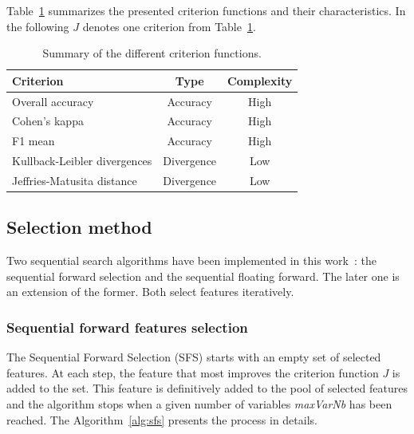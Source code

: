 \documentclass[journal]{IEEEtran}
\begin{document}
        Table~\ref{tab:crit} summarizes the presented criterion functions and their characteristics. In the following $J$ denotes one criterion from Table~\ref{tab:crit}.

        \begin{table}[!t]
            \centering
            \caption{Summary of the different criterion functions.\label{tab:crit}}
            \begin{tabular}[b]{lcc}
              \toprule
              Criterion & Type & Complexity \\
              \midrule
              Overall accuracy            & Accuracy   & High \\
              Cohen's kappa               & Accuracy   & High\\
              F1 mean                     & Accuracy   & High\\
              \midrule
              Kullback-Leibler divergences & Divergence & Low \\
              Jeffries-Matusita distance  & Divergence & Low \\
              \bottomrule
            \end{tabular}
        \end{table}

        \subsection{Selection method}
        \label{sec:selection:method}
        Two  sequential  search  algorithms have been  implemented  in  this
        work~\cite{Guyon:2006:FEF:1208773}:  the   sequential  forward
        selection and the sequential  floating forward.  The later one
        is  an   extension  of   the  former.  Both   select  features
        iteratively.

        \subsubsection{Sequential forward features selection}
        \label{sec:forward-presentation}

        The Sequential Forward Selection (SFS) starts with an empty set of selected features.  At each  step, the feature that most  improves the criterion function $J$  is added  to the set. This feature is definitively added to the pool of selected features and the algorithm stops when a given number of variables \emph{maxVarNb} has been reached. The Algorithm~\ref{alg:sfs} presents the process in details.
\end{document}

